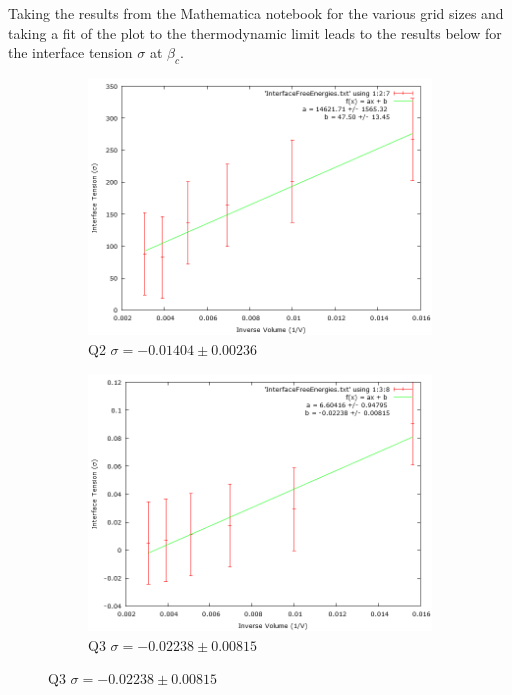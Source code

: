 Taking the results from the Mathematica notebook for the various grid sizes and taking a fit of the plot to the thermodynamic limit leads to the results below for the interface tension $\sigma$ at $\beta_c$.
\begin{figure}[H]
\centering
\begin{subfigure}[b]{0.45\textwidth}
    \includegraphics[width=\textwidth]{4-Results/Q2-InterfaceTension.png}
    \caption{Q2 $\sigma = -0.01404 \pm 0.00236$}
\end{subfigure}
\begin{subfigure}[b]{0.45\textwidth}
    \includegraphics[width=\textwidth]{4-Results/Q3-InterfaceTension.png}
    \caption{Q3 $\sigma = -0.02238 \pm 0.00815$}
\end{subfigure}


\end{figure}
